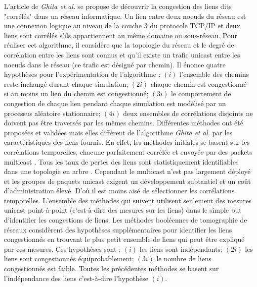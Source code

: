 L'article de {\em Ghita et al.} \cite{ghitaArgyrakiThiran2010} se propose de d\'ecouvrir la congestion des liens dits "corr\'el\'es" dans un r\'eseau informatique.
Un lien entre deux noeuds du r\'eseau est une connexion logique au niveau de la couche $3$ du protocole TCP/IP et deux liens sont corr\'el\'es s'ils appartiennent au m\^eme domaine ou sous-r\'eseau.
Pour r\'ealiser cet algorithme, il consid\`ere que la topologie du r\'eseau et le degr\'e de corr\'elation entre les liens sont connus et qu'il existe un trafic unicast entre les noeuds dans le r\'eseau (ce trafic est d\'esign\'e par chemin).
Il \'enonce quatre hypoth\`eses pour l'exp\'erimentation de l'algorithme : 
$(i)$ l'ensemble des chemins reste inchang\'e durant chaque simulation; 
$(2i)$ chaque chemin est congestionn\'e si au moins un lien du chemin est congestionn\'e; 
$(3i)$ le comportement de congestion de chaque lien pendant chaque simulation est mod\'elis\'e par un processus al\'eatoire stationnaire; 
$(4i)$ deux ensembles de corr\'elations disjoints ne doivent pas \^etre travers\'es par les m\^emes chemins.
\newline
Diff\'erentes m\'ethodes ont \'et\'e propos\'ees et valid\'ees mais elles diff\`erent de l'algorithme {\em Ghita et al.} \cite{ghitaArgyrakiThiran2010} par les caract\'eristiques des liens fournis.
En effet, les m\'ethodes initiales se basent sur les corr\'elations temporelles, chacune parfaitement corr\'el\'ee et envoy\'ee par des packets multicast \cite{adamsBuFreidmanHorowitz2000, aryaDuffieldVeitch2008, buDuffieldPrestiTowsley2002, caceresDuffieldHorowistzTowsley1999}. 
Tous les taux de pertes des liens sont statistiquement identifiables dans une topologie en arbre \cite{chenCaoBu2007}.
Cependant le multicast n'est pas largement d\'eploy\'e et les groupes de paquets unicast exigent un d\'eveloppement subtantiel et un co\^ut d'administration \'elev\'e. D'o\`u il est moins ais\'e de s\'electionner les corr\'elations temporelles.
\newline
L'ensemble des m\'ethodes qui suivent \cite{nGDuffield2006, padmanabhanQiuWang2003,sommerBarfordDuffieldRon2007, zhaoChenBindel2006} utilisent seulement des mesures unicast point-\`a-point (c'est-\`a-dire des mesures sur les liens) dans le simple but d'identifier les congestions de liens.
\newline
Les m\'ethodes bool\'eennes de tomographie de r\'eseaux consid\`erent des hypoth\`eses suppl\'ementaires \cite{padmanabhanQiuWang2003,nGDuffield2006} pour identifier les liens congestionn\'es en trouvant le plus petit ensemble de liens qui peut \^etre expliqu\'e par ces mesures.
Ces hypoth\`eses sont : 
$(i)$ les liens sont ind\'ependants;
$(2i)$ les liens sont congestionn\'es \'equiprobablement; 
$(3i)$ le nombre de liens congestionn\'es est faible.
Toutes les pr\'ec\'edentes m\'ethodes \cite{ghitaArgyrakiThiran2010, nGDuffield2006, padmanabhanQiuWang2003,sommerBarfordDuffieldRon2007, zhaoChenBindel2006} se basent sur l'ind\'ependance des liens c'est-\`a-dire l'hypoth\`ese $(i)$.

